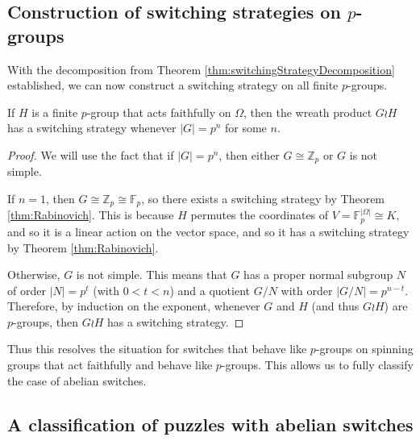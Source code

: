 \subsection{Construction of switching strategies on \texorpdfstring{$p$}{p}-groups}
With the decomposition from Theorem \ref{thm:switchingStrategyDecomposition}
established, we can now construct a switching strategy on all finite $p$-groups.

\begin{theorem}
  If $H$ is a finite $p$-group that acts faithfully on $\Omega$,
  then the wreath product
  $G \wr H$ has a switching strategy whenever $|G| = p^n$ for some $n$.
  \label{thm:pGroupStrategy}
\end{theorem}
\begin{proof}
  We will use the fact that if $|G| = p^n$,
  then either $G \cong \mathbb{Z}_p$ or $G$ is not simple.

  If $n = 1$, then $G \cong \mathbb{Z}_p \cong \mathbb F_p$, so there exists a
  switching strategy by Theorem \ref{thm:Rabinovich}. This is because $H$
  permutes the coordinates of $V = \mathbb F_p^{|\Omega|} \cong K$, and so it is a
  linear action on the vector space, and so it has a switching strategy by
  Theorem \ref{thm:Rabinovich}.

  Otherwise, $G$ is not simple. This means that $G$ has a proper normal subgroup
  $N$ of order $|N| = p^t$ (with $0 < t < n$)
  and a quotient $G/N$ with order $|G/N| = p^{n-t}$.
  Therefore, by induction on the exponent,
  whenever $G$ and $H$ (and thus $G \wr H$) are $p$-groups,
  then $G \wr H$ has a switching strategy.
\end{proof}

Thus this resolves the situation for switches that behave like $p$-groups on
spinning groups that act faithfully and behave like $p$-groups. This allows us
to fully classify the case of abelian switches.

\subsection{A classification of puzzles with abelian switches}

